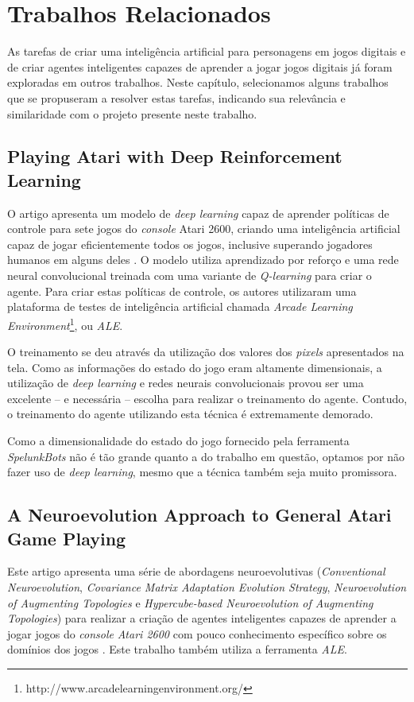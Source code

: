 \chapter{\label{chap:related-work}Trabalhos Relacionados}
As tarefas de criar uma inteligência artificial para personagens em jogos
digitais e de criar agentes inteligentes capazes de aprender a jogar jogos
digitais já foram exploradas em outros trabalhos. Neste capítulo, selecionamos
alguns trabalhos que se propuseram a resolver estas tarefas, indicando sua
relevância e similaridade com o projeto presente neste trabalho. 


\section{Playing Atari with Deep Reinforcement Learning}
O artigo apresenta um modelo de \textit{deep learning} capaz de aprender
políticas de controle para sete jogos do \textit{console} Atari 2600, criando
uma inteligência artificial capaz de jogar eficientemente todos os jogos,
inclusive superando jogadores humanos em alguns deles
\cite{DBLP:journals/corr/MnihKSGAWR13}. O modelo utiliza aprendizado por reforço
e uma rede neural convolucional treinada com uma variante de \textit{Q-learning}
para criar o agente. Para criar estas políticas de controle, os autores
utilizaram uma plataforma de testes de inteligência artificial chamada
\textit{Arcade Learning
Environment}\footnote{http://www.arcadelearningenvironment.org/}, ou
\textit{ALE}.

O treinamento se deu através da utilização dos valores dos \textit{pixels}
apresentados na tela. Como as informações do estado do jogo eram altamente
dimensionais, a utilização de \textit{deep learning} e redes neurais
convolucionais provou ser uma excelente -- e necessária -- escolha para realizar
o treinamento do agente. Contudo, o treinamento do agente utilizando esta
técnica é extremamente demorado.

Como a dimensionalidade do estado do jogo fornecido pela ferramenta
\textit{SpelunkBots} não é tão grande quanto a do trabalho em questão, optamos
por não fazer uso de \textit{deep learning}, mesmo que a técnica também seja
muito promissora.


\section{A Neuroevolution Approach to General Atari Game Playing}
Este artigo apresenta uma série de abordagens neuroevolutivas
(\textit{Conventional Neuroevolution}, \textit{Covariance Matrix Adaptation
Evolution Strategy}, \textit{Neuroevolution of Augmenting Topologies} e
\textit{Hypercube-based Neuroevolution of Augmenting Topologies}) para realizar
a criação de agentes inteligentes capazes de aprender a jogar jogos do
\textit{console} \textit{Atari 2600} com pouco conhecimento específico sobre os
domínios dos jogos \cite{NeuroEvolutionAtari}. Este trabalho também utiliza a
ferramenta \textit{ALE}.

